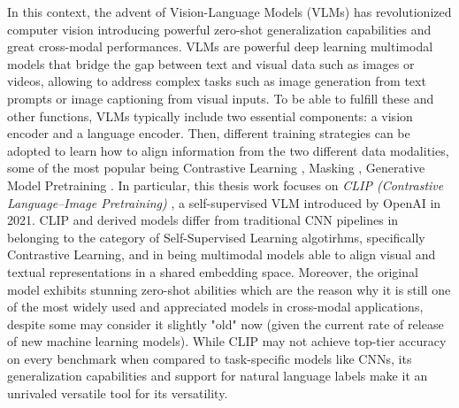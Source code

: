 \documentclass[a4paper, oneside, english]{sapthesis} %
\begin{document}
In this context, the advent of Vision-Language Models (VLMs) has revolutionized computer vision \cite{marimo2025beyond} introducing powerful zero-shot generalization capabilities and great cross-modal performances. VLMs are powerful deep learning multimodal models that bridge the gap between text and visual data such as images or videos, allowing to address complex tasks such as image generation from text prompts or image captioning from visual inputs. To be able to fulfill these and other functions, VLMs typically include two essential components: a vision encoder and a language encoder. Then, different training strategies can be adopted to learn how to align information from the two different data modalities, some of the most popular being Contrastive Learning \cite{radford2021learning} \cite{chen2020simple} \cite{he2020momentum} \cite{jia2021scaling}, Masking \cite{singh2022flava}, Generative Model Pretraining \cite{ramesh2022hierarchical} \cite{rombach2022high} \cite{saharia2022photorealistic} \cite{alayrac2022flamingo}. In particular, this thesis work focuses on \emph{CLIP (Contrastive Language–Image Pretraining)} \cite{radford2021learning}, a self-supervised VLM introduced by OpenAI in 2021. CLIP and derived models differ from traditional CNN pipelines in belonging to the category of Self-Supervised Learning algotirhms, specifically Contrastive Learning, and in being multimodal models able to align visual and textual representations in a shared embedding space. Moreover, the original model exhibits stunning zero-shot abilities which are the reason why it is still one of the most widely used and appreciated models in cross-modal applications, despite some may consider it slightly "old" now (given the current rate of release of new machine learning models). While CLIP may not achieve top-tier accuracy on every benchmark when compared to task-specific models like CNNs, its generalization capabilities and support for natural language labels make it an unrivaled versatile tool for its versatility.
\end{document}
